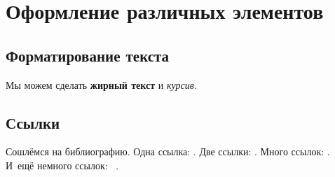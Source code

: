 \chapter{Оформление различных элементов}\label{ch:ch1}

\section{Форматирование текста}\label{sec:ch1/sec1}

Мы можем сделать \textbf{жирный текст} и \textit{курсив}.

\section{Ссылки}\label{sec:ch1/sec2}

Сошлёмся на библиографию.
Одна ссылка: \cite[с.~54]{Sokolov}\cite[с.~36]{Gaidaenko}.
Две ссылки: \cite{Sokolov,Gaidaenko}.
Много ссылок: %
\cite{Lermontov, Management, Borozda, Marketing, Constitution, FamilyCode,
Gost.7.0.53, Razumovski, Lagkueva, Pokrovski, Methodology, Nasirova, Berestova,
Kriger}%
%
.
И~ещё немного ссылок:~\cite{Article,Book,Booklet,Conference,Inbook,Incollection,Manual,Mastersthesis,
Misc,Phdthesis,Proceedings,Techreport,Unpublished}
\cite{medvedev2006jelektronnye, CEAT:CEAT581, doi:10.1080/01932691.2010.513279,
Gosele1999161,Li2007StressAnalysis, Shoji199895, test:eisner-sample,
test:eisner-sample-shorted, AB_patent_Pomerantz_1968, iofis_patent1960}
%
.

%

